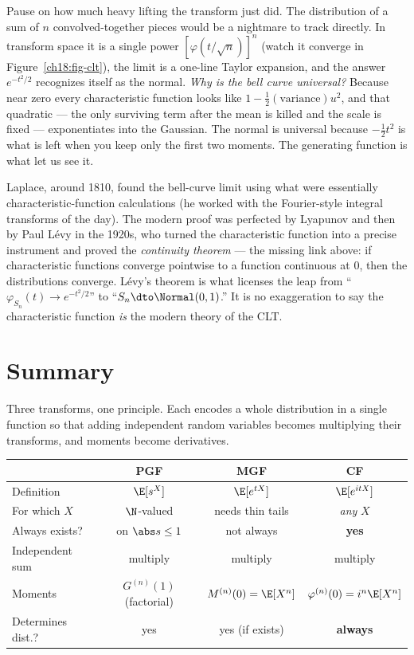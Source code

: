 Pause on how much heavy lifting the transform just did. The distribution of a
sum of $n$ convolved-together pieces would be a nightmare to track directly. In
transform space it is a single power $[\varphi(t/\sqrt n)]^n$ (watch it converge
in Figure~\ref{ch18:fig-clt}), the limit is a one-line Taylor expansion, and the
answer $e^{-t^2/2}$ recognizes itself as the normal. \emph{Why is the bell curve universal?} Because near zero every
characteristic function looks like $1-\frac12(\text{variance})u^2$, and that
quadratic --- the only surviving term after the mean is killed and the scale is
fixed --- exponentiates into the Gaussian. The normal is universal because
$-\frac12 t^2$ is what is left when you keep only the first two moments. The
generating function is what let us see it.

\begin{historybox}
Laplace, around 1810, found the bell-curve limit using what were essentially
characteristic-function calculations (he worked with the Fourier-style integral
transforms of the day). The modern proof was perfected by Lyapunov and then by
Paul L\'evy in the 1920s, who turned the characteristic function into a precise
instrument and proved the \emph{continuity theorem} --- the missing link above:
if characteristic functions converge pointwise to a function continuous at $0$,
then the distributions converge. L\'evy's theorem is what licenses the leap from
``$\varphi_{S_n}(t)\to e^{-t^2/2}$'' to ``$S_n\dto\Normal(0,1)$.'' It is no
exaggeration to say the characteristic function \emph{is} the modern theory of
the CLT.
\end{historybox}

\section{Summary}
\label{ch18:summary}

Three transforms, one principle. Each encodes a whole distribution in a single
function so that adding independent random variables becomes multiplying their
transforms, and moments become derivatives.

\begin{center}
\begin{tabular}{@{}lccc@{}}
\toprule
 & \textbf{PGF} & \textbf{MGF} & \textbf{CF} \\
\midrule
Definition       & $\E[s^X]$ & $\E[e^{tX}]$ & $\E[e^{itX}]$ \\
For which $X$    & $\N$-valued & needs thin tails & \emph{any} $X$ \\
Always exists?   & on $\abs s\le1$ & not always & \textbf{yes} \\
Independent sum  & multiply & multiply & multiply \\
Moments          & $G^{(n)}(1)$ (factorial) & $M^{(n)}(0)=\E[X^n]$
                 & $\varphi^{(n)}(0)=i^n\E[X^n]$ \\
Determines dist.? & yes & yes (if exists) & \textbf{always} \\
\bottomrule
\end{tabular}
\end{center}

